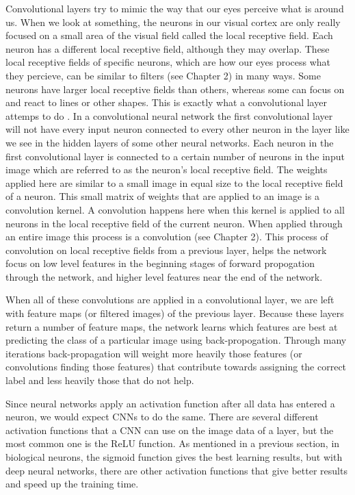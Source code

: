 \documentclass[12pt]{report} %
\begin{document}
	Convolutional layers try to mimic the way that our eyes perceive what is around us. When we look at something, the neurons in our visual cortex are only really focused on a small area of the visual field called the local receptive field. Each neuron has a different local receptive field, although they may overlap. These local receptive fields of specific neurons, which are how our eyes process what they percieve, can be similar to filters (see Chapter 2) in many ways. Some neurons have larger local receptive fields than others, whereas some can focus on and react to lines or other shapes. This is exactly what a convolutional layer attemps to do\cite{aurelienMachineLearning} 
.	
	In a convolutional neural network the first convolutional layer will not have every input neuron connected to every other neuron in the layer like we see in the hidden layers of some other neural networks. Each neuron in the first convolutional layer is connected to a certain number of neurons in the input image which are referred to as the neuron's local receptive field. The weights applied here are similar to a small image in equal size to the local receptive field of a neuron. This small matrix of weights that are applied to an image is a convolution kernel. A convolution happens here when this kernel is applied to all neurons in the local receptive field of the current neuron. When applied through an entire image this process is a convolution (see Chapter 2). This process of convolution on local receptive fields from a previous layer, helps the network focus on low level features in the beginning stages of forward propogation through the network, and higher level features near the end of the network\cite{aurelienMachineLearning}.
	
	When all of these convolutions are applied in a convolutional layer, we are left with feature maps (or filtered images) of the previous layer. Because these layers return a number of feature maps, the network learns which features are best at predicting the class of a particular image using back-propogation. Through many iterations back-propagation will weight more heavily those features (or convolutions finding those features) that contribute towards assigning the correct label and less heavily those that do not help.
	
	Since neural networks apply an activation function after all data has entered a neuron, we would expect CNNs to do the same. There are several different activation functions that a CNN can use on the image data of a layer, but the most common one is the ReLU function. As mentioned in a previous section, in biological neurons, the sigmoid function gives the best learning results, but with deep neural networks, there are other activation functions that give better results and speed up the training time\cite{krizhevsky2012imagenet}.
	
\end{document}
